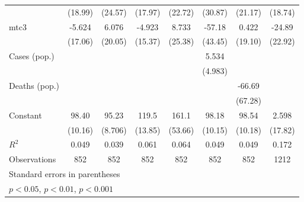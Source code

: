 \documentclass{article}
\begin{document}
{\begin{longtable}{l*{7}{c}}
                &  (18.99)         &  (24.57)         &  (17.97)         &  (22.72)         &  (30.87)         &  (21.17)         &  (18.74)         \\
mtc3            &   -5.624         &    6.076         &   -4.923         &    8.733         &   -57.18         &    0.422         &   -24.89         \\
                &  (17.06)         &  (20.05)         &  (15.37)         &  (25.38)         &  (43.45)         &  (19.10)         &  (22.92)         \\
Cases (pop.)    &                  &                  &                  &                  &    5.534         &                  &                  \\
                &                  &                  &                  &                  &  (4.983)         &                  &                  \\
Deaths (pop.)   &                  &                  &                  &                  &                  &   -66.69         &                  \\
                &                  &                  &                  &                  &                  &  (67.28)         &                  \\
Constant        &    98.40\sym{***}&    95.23\sym{***}&    119.5\sym{***}&    161.1\sym{*}  &    98.18\sym{***}&    98.54\sym{***}&    2.598         \\
                &  (10.16)         &  (8.706)         &  (13.85)         &  (53.66)         &  (10.15)         &  (10.18)         &  (17.82)         \\
\hline
\(R^{2}\)       &    0.049         &    0.039         &    0.061         &    0.064         &    0.049         &    0.049         &    0.172         \\
Observations    &      852         &      852         &      852         &      852         &      852         &      852         &     1212         \\
\hline\hline
\multicolumn{8}{l}{\footnotesize Standard errors in parentheses}\\
\multicolumn{8}{l}{\footnotesize \sym{*} \(p<0.05\), \sym{**} \(p<0.01\), \sym{***} \(p<0.001\)}\\
\end{longtable}
}
\end{document}

